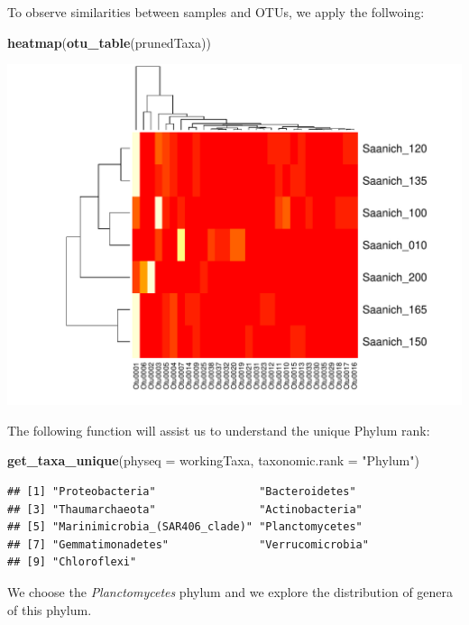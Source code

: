\documentclass[11 pt,]{article}
\newenvironment{Shaded}{\begin{snugshade}}{\end{snugshade}}
\newcommand{\KeywordTok}[1]{\textcolor[rgb]{0.13,0.29,0.53}{\textbf{#1}}}
\newcommand{\DataTypeTok}[1]{\textcolor[rgb]{0.13,0.29,0.53}{#1}}
\newcommand{\StringTok}[1]{\textcolor[rgb]{0.31,0.60,0.02}{#1}}
\newcommand{\NormalTok}[1]{#1}
\begin{document}
To observe similarities between samples and OTUs, we apply the
follwoing:

\begin{Shaded}
\begin{Highlighting}[]
\KeywordTok{heatmap}\NormalTok{(}\KeywordTok{otu_table}\NormalTok{(prunedTaxa))}
\end{Highlighting}
\end{Shaded}

\includegraphics{Figs/unnamed-chunk-10-1.pdf}

The following function will assist us to understand the unique Phylum
rank:

\begin{Shaded}
\begin{Highlighting}[]
\KeywordTok{get_taxa_unique}\NormalTok{(}\DataTypeTok{physeq =}\NormalTok{ workingTaxa, }\DataTypeTok{taxonomic.rank =} \StringTok{"Phylum"}\NormalTok{)}
\end{Highlighting}
\end{Shaded}

\begin{verbatim}
## [1] "Proteobacteria"                "Bacteroidetes"                
## [3] "Thaumarchaeota"                "Actinobacteria"               
## [5] "Marinimicrobia_(SAR406_clade)" "Planctomycetes"               
## [7] "Gemmatimonadetes"              "Verrucomicrobia"              
## [9] "Chloroflexi"
\end{verbatim}

We choose the \emph{Planctomycetes} phylum and we explore the
distribution of genera of this phylum.
\end{document}
